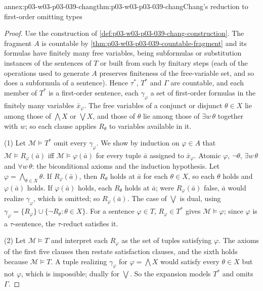 \begin{annexitem}{annex:p03-w03-p03-039-chang}{thm:p03-w03-p03-039-chang}{Chang's reduction to first-order omitting types}
\begin{proof}
Use the construction of \cref{def:p03-w03-p03-039-chang-construction}. The
fragment \(A\) is countable by \cref{thm:p03-w03-p03-039-countable-fragment}
and its formulas have finitely many free variables, being subformulas or
substitution instances of the sentences of \(T\) or built from such by
finitary steps (each of the operations used to generate \(A\) preserves
finiteness of the free-variable set, and so does a subformula of a sentence).
Hence \(\tau^*\), \(T^*\) and \(\Gamma\) are countable, and each member of
\(T^*\) is a first-order sentence, each \(\gamma_\varphi\) a set of
first-order formulas in the finitely many variables \(\bar x_\varphi\).
The free variables of a conjunct or disjunct \(\theta\in X\) lie among
those of \(\bigwedge X\) or \(\bigvee X\), and those of \(\theta\) lie among
those of \(\exists w\,\theta\) together with \(w\); so each clause applies
\(R_\theta\) to variables available in it.

(1) Let \(\mathcal M\models T^*\) omit every \(\gamma_\varphi\). We show by
induction on \(\varphi\in A\) that \(\mathcal M\models R_\varphi(\bar a)\)
iff \(\mathcal M\models\varphi(\bar a)\) for every tuple \(\bar a\) assigned
to \(\bar x_\varphi\). Atomic \(\varphi\), \(\neg\theta\), \(\exists w\,\theta\)
and \(\forall w\,\theta\): the biconditional axioms and the induction
hypothesis. Let \(\varphi=\bigwedge_{\theta\in X}\theta\). If
\(R_\varphi(\bar a)\), then \(R_\theta\) holds at \(\bar a\) for each
\(\theta\in X\), so each \(\theta\) holds and \(\varphi(\bar a)\) holds. If
\(\varphi(\bar a)\) holds, each \(R_\theta\) holds at \(\bar a\); were
\(R_\varphi(\bar a)\) false, \(\bar a\) would realize \(\gamma_\varphi\),
which is omitted; so \(R_\varphi(\bar a)\). The case of \(\bigvee\) is dual,
using \(\gamma_\varphi=\{R_\varphi\}\cup\{\neg R_\theta:\theta\in X\}\). For a
sentence \(\varphi\in T\), \(R_\varphi\in T^*\) gives
\(\mathcal M\models\varphi\); since \(\varphi\) is a \(\tau\)-sentence, the
\(\tau\)-reduct satisfies it.

(2) Let \(\mathcal M\models T\) and interpret each \(R_\varphi\) as the set
of tuples satisfying \(\varphi\). The axioms of the first five clauses then
restate satisfaction clauses, and the sixth holds because
\(\mathcal M\models T\). A tuple realizing \(\gamma_\varphi\) for
\(\varphi=\bigwedge X\) would satisfy every \(\theta\in X\) but not
\(\varphi\), which is impossible; dually for \(\bigvee\). So the expansion
models \(T^*\) and omits \(\Gamma\).
\end{proof}
\end{annexitem}


